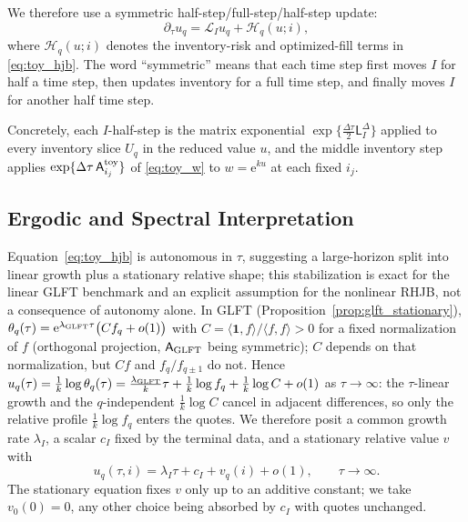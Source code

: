 \documentclass[11pt,a4paper]{article}
\newcommand{\Lcal}{\mathcal{L}}
\newcommand{\e}{\mathrm e}
\theoremstyle{plain}
\theoremstyle{definition}
\begin{document}
We therefore use a symmetric
half-step/full-step/half-step update:
\[
\partial_\tau u_q
=
\Lcal_Iu_q+\mathcal H_q(u;i),
\]
where \(\mathcal H_q(u;i)\) denotes the inventory-risk and optimized-fill
terms in \eqref{eq:toy_hjb}.  The word ``symmetric'' means that each time
step first moves \(I\) for half a time step, then updates inventory for a full
time step, and finally moves \(I\) for another half time step.

Concretely, each \(I\)-half-step is the matrix exponential
\(\exp\{\tfrac{\Delta\tau}{2}\mathsf L_I^\Delta\}\) applied to every inventory
slice \(U_q\) in the reduced value \(u\), and the middle
inventory step applies \(\exp\{\Delta\tau\,\mathsf A_{i_j}^{\rm toy}\}\) of
\eqref{eq:toy_w} to \(w=\e^{ku}\) at each fixed \(i_j\).  

\subsection{Ergodic and Spectral Interpretation}

Equation~\eqref{eq:toy_hjb} is autonomous in \(\tau\), suggesting a
large-horizon split into linear growth plus a stationary relative shape; this
stabilization is exact for the linear GLFT benchmark and an explicit
assumption for the nonlinear RHJB, not a consequence of autonomy alone.  In
GLFT (Proposition~\ref{prop:glft_stationary}),
\(\theta_q(\tau)=\e^{\lambda_{\rm GLFT}\tau}\bigl(Cf_q+o(1)\bigr)\) with
\(C=\langle\mathbf 1,f\rangle/\langle f,f\rangle>0\) for a fixed normalization
of \(f\) (orthogonal projection, \(\mathsf A_{\rm GLFT}\) being symmetric);
\(C\) depends on that normalization, but \(Cf\) and \(f_q/f_{q\pm1}\) do not.
Hence \(u_q(\tau)=\tfrac1k\log\theta_q(\tau)=\tfrac{\lambda_{\rm GLFT}}{k}\tau
+\tfrac1k\log f_q+\tfrac1k\log C+o(1)\) as \(\tau\to\infty\): the
\(\tau\)-linear growth and the \(q\)-independent \(\tfrac1k\log C\) cancel in
adjacent differences, so only the relative profile \(\tfrac1k\log f_q\) enters
the quotes.  We therefore posit a common growth rate \(\lambda_I\), a scalar
\(c_I\) fixed by the terminal data, and a stationary relative value \(v\) with
\begin{equation}
u_q(\tau,i)=\lambda_I\tau+c_I+v_q(i)+o(1),
\qquad\tau\to\infty.
\label{eq:toy_ergodic_ansatz}
\end{equation}
The stationary equation fixes \(v\) only up to an additive constant; we take
\(v_0(0)=0\), any other choice being absorbed by \(c_I\) with quotes unchanged.
\end{document}
